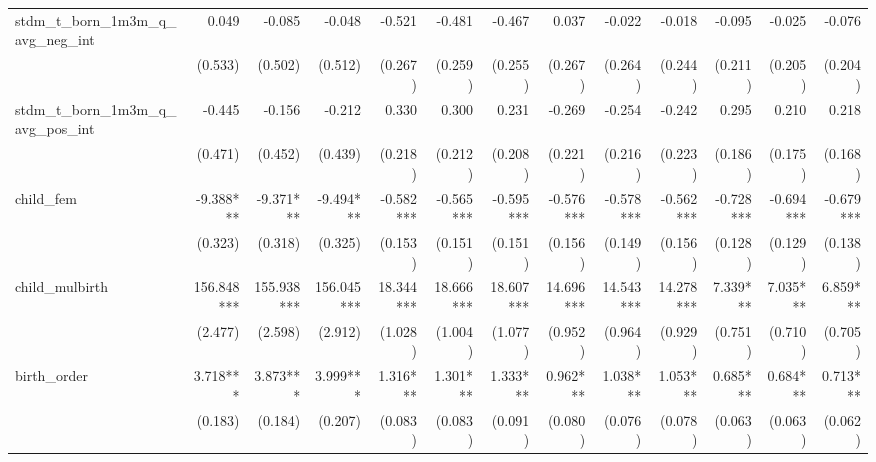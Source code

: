 \begin{tabular}{lrrrrrrrrrrrr}
stdm\_t\_born\_1m3m\_q\_avg\_neg\_int       &        0.049 &       -0.085 &       -0.048 &       -0.521 &       -0.481 &       -0.467 &        0.037 &       -0.022 &       -0.018 &       -0.095 &       -0.025 &       -0.076 \\ 
                                            &      (0.533) &      (0.502) &      (0.512) &      (0.267) &      (0.259) &      (0.255) &      (0.267) &      (0.264) &      (0.244) &      (0.211) &      (0.205) &      (0.204) \\ 
stdm\_t\_born\_1m3m\_q\_avg\_pos\_int       &       -0.445 &       -0.156 &       -0.212 &        0.330 &        0.300 &        0.231 &       -0.269 &       -0.254 &       -0.242 &        0.295 &        0.210 &        0.218 \\ 
                                            &      (0.471) &      (0.452) &      (0.439) &      (0.218) &      (0.212) &      (0.208) &      (0.221) &      (0.216) &      (0.223) &      (0.186) &      (0.175) &      (0.168) \\ 
child\_fem                                  &    -9.388*** &    -9.371*** &    -9.494*** &    -0.582*** &    -0.565*** &    -0.595*** &    -0.576*** &    -0.578*** &    -0.562*** &    -0.728*** &    -0.694*** &    -0.679*** \\ 
                                            &      (0.323) &      (0.318) &      (0.325) &      (0.153) &      (0.151) &      (0.151) &      (0.156) &      (0.149) &      (0.156) &      (0.128) &      (0.129) &      (0.138) \\ 
child\_mulbirth                             &   156.848*** &   155.938*** &   156.045*** &    18.344*** &    18.666*** &    18.607*** &    14.696*** &    14.543*** &    14.278*** &     7.339*** &     7.035*** &     6.859*** \\ 
                                            &      (2.477) &      (2.598) &      (2.912) &      (1.028) &      (1.004) &      (1.077) &      (0.952) &      (0.964) &      (0.929) &      (0.751) &      (0.710) &      (0.705) \\ 
birth\_order                                &     3.718*** &     3.873*** &     3.999*** &     1.316*** &     1.301*** &     1.333*** &     0.962*** &     1.038*** &     1.053*** &     0.685*** &     0.684*** &     0.713*** \\ 
                                            &      (0.183) &      (0.184) &      (0.207) &      (0.083) &      (0.083) &      (0.091) &      (0.080) &      (0.076) &      (0.078) &      (0.063) &      (0.063) &      (0.062) \\ 

\end{tabular}
